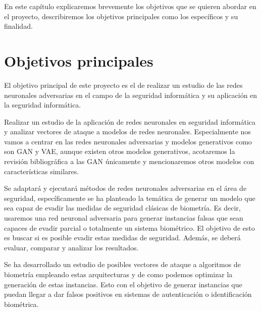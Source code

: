 En este capítulo explicaremos brevemente los objetivos que se quieren abordar en el proyecto, describiremos los objetivos principales como los específicos y su finalidad.



\section{Objetivos principales}



El objetivo principal de este proyecto es el de realizar un estudio de las redes neuronales adversarias en el campo de la seguridad informática y su aplicación en la seguridad informática.

Realizar un estudio de la aplicación de redes neuronales en seguridad informática y analizar vectores de ataque a modelos de redes neuronales. Especialmente nos vamos a centrar en las redes neuronales adversarias y modelos generativos como son \gls{GAN} y \gls{VAE}, aunque existen otros modelos generativos, acotaremos la revisión bibliográfica a las \gls{GAN} únicamente y mencionaremos otros modelos con características similares.

Se adaptará y ejecutará métodos de redes neuronales adversarias en el área de seguridad, específicamente se ha planteado la temática de generar un modelo que sea capaz de evadir las medidas de seguridad clásicas de biometría. Es decir, usaremos una red neuronal adversaria para generar instancias falsas que sean capaces de evadir parcial o totalmente un sistema biométrico. El objetivo de esto es buscar si es posible evadir estas medidas de seguridad. Además, se deberá evaluar, comparar y analizar los resultados.

Se ha desarrollado un estudio de posibles vectores de ataque a algoritmos de biometría empleando estas arquitecturas y de como podemos optimizar la generación de estas instancias. Esto con el objetivo de generar instancias que puedan llegar a dar falsos positivos en sistemas de autenticación o identificación biométrica.

